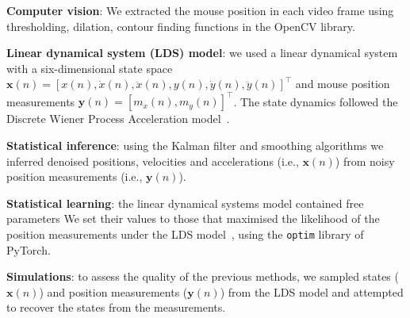 
\noindent\textbf{Computer vision}: 
%
We extracted the mouse position in each video frame using thresholding,
dilation, contour finding functions in the OpenCV library.

\noindent\textbf{Linear dynamical system (LDS) model}:
%
we used a linear dynamical system with a six-dimensional state space
$\mathbf{x}(n)=[x(n), \dot{x}(n), \ddot{x}(n), y(n), \dot{y}(n),
\ddot{y}(n)]^\intercal$ and mouse position measurements $\mathbf{y}(n)=[m_x(n),
m_y(n)]^\intercal$.  The state dynamics followed the Discrete Wiener
Process Acceleration model~\cite{c1}.

\noindent\textbf{Statistical inference}:
%
using the Kalman filter and smoothing algorithms\cite{c2} we
inferred denoised positions, velocities and accelerations (i.e., $\mathbf{x}(n)$)
from noisy position measurements (i.e., $\mathbf{y}(n)$).

\noindent\textbf{Statistical learning}:
%
the linear dynamical systems model contained free parameters We set their values
to those that maximised the likelihood of the position measurements under the
LDS model~\cite{c2}, using the \texttt{optim} library of PyTorch.

\noindent\textbf{Simulations}:
%
to assess the quality of the previous methods, we sampled states
($\mathbf{x}(n)$) and position measurements ($\mathbf{y}(n)$) from the LDS
model and attempted to recover the states from the measurements.
